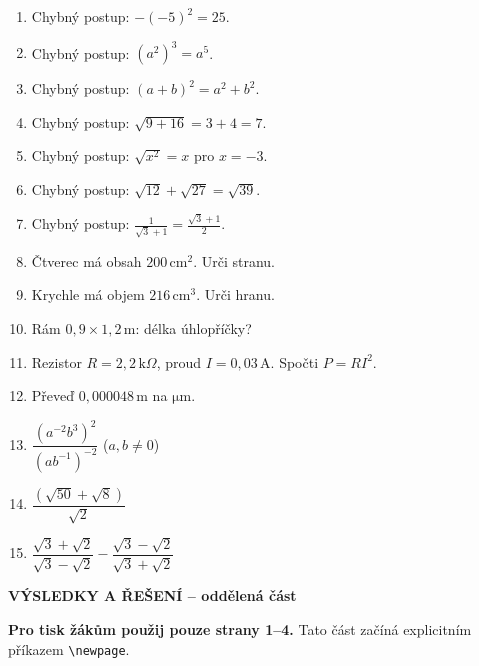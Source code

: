 \documentclass[11pt,a4paper]{article}
\begin{document}
\begin{minipage}[t]{.49\textwidth}
\begin{enumerate}[label=\textbf{\arabic*.},leftmargin=8mm,itemsep=11pt,topsep=3pt,start=106]
\normalsize
\item Chybný postup: $-(-5)^2=25$.
\item Chybný postup: $(a^2)^3=a^5$.
\item Chybný postup: $(a+b)^2=a^2+b^2$.
\item Chybný postup: $\sqrt{9+16}=3+4=7$.
\item Chybný postup: $\sqrt{x^2}=x$ pro $x=-3$.
\item Chybný postup: $\sqrt{12}+\sqrt{27}=\sqrt{39}$.
\item Chybný postup: $\frac1{\sqrt3+1}=\frac{\sqrt3+1}2$.
\item Čtverec má obsah $200\,\mathrm{cm}^2$. Urči stranu.
\item Krychle má objem $216\,\mathrm{cm}^3$. Urči hranu.
\item Rám $0{,}9\times1{,}2\,\mathrm m$: délka úhlopříčky?
\item Rezistor $R=2{,}2\,\mathrm{k}\Omega$, proud $I=0{,}03\,\mathrm A$. Spočti $P=RI^2$.
\item Převeď $0{,}000048\,\mathrm m$ na $\mathrm{\mu m}$.
\item $\dfrac{(a^{-2}b^3)^2}{(ab^{-1})^{-2}}$ ($a,b\ne0$)
\item $\dfrac{(\sqrt{50}+\sqrt8)}{\sqrt2}$
\item $\dfrac{\sqrt3+\sqrt2}{\sqrt3-\sqrt2}-\dfrac{\sqrt3-\sqrt2}{\sqrt3+\sqrt2}$
\end{enumerate}
\end{minipage}

\newpage
\begin{center}{\Large\bfseries VÝSLEDKY A ŘEŠENÍ -- oddělená část}\end{center}
\noindent\textbf{Pro tisk žákům použij pouze strany 1--4.} Tato část začíná explicitním příkazem \texttt{\textbackslash newpage}.\par\vspace{2mm}
\end{document}
